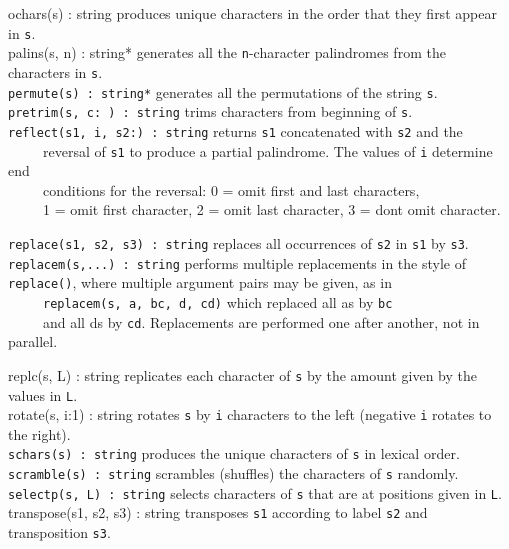 \textsf{ochars(s) : string} produces unique characters in the order that
they first appear in \texttt{s}.\\
\textsf{palins(s, n) : string*} generates all the \texttt{n}{}-character
palindromes from the characters in
\texttt{s}.\\
\texttt{permute(s) : string*} generates all the permutations of the
string \texttt{s}.\\
\texttt{pretrim(s, c:{\textquotesingle} {\textquotesingle}) : string}
trims characters from beginning of \texttt{s}.\\
\texttt{reflect(s1, i, s2:{\textquotedbl}{\textquotedbl}) : string}
returns \texttt{s1} concatenated with \texttt{s2} and the\\
 \ \ \ \ \ reversal of \texttt{s1} to produce a partial palindrome. The
values of \texttt{i} determine {\textquotedbl}end\\
 \ \ \ \ \ conditions{\textquotedbl} for the reversal: 0 = omit first
and last characters,\\
 \ \ \ \ \ 1 = omit first character, 2 = omit last character, 3 =
don{\textquotesingle}t omit character.

\texttt{replace(s1, s2, s3) : string} replaces all occurrences of
\texttt{s2} in \texttt{s1} by \texttt{s3}.\\
\texttt{replacem(s,...) : string} performs multiple replacements in the style of \texttt{replace()}, where multiple
argument pairs may be given, as in\\
 \ \ \ \ \ \texttt{replacem(s, {\textquotedbl}a{\textquotedbl},
{\textquotedbl}bc{\textquotedbl}, {\textquotedbl}d{\textquotedbl},
{\textquotedbl}cd{\textquotedbl})} which replaced all
a{\textquotesingle}s by
\texttt{{\textquotedbl}bc{\textquotedbl}\\
} \ \ \ \ \ and all d{\textquotesingle}s by
\texttt{{\textquotedbl}cd{\textquotedbl}}. Replacements are performed
one after another, not in parallel.

\textsf{replc(s, L) : string} replicates each character of \texttt{s} by
the amount given by the values in \texttt{L}.\\
\textsf{rotate(s, i:1) : string} rotates \texttt{s} by \texttt{i}
characters to the left (negative \texttt{i} rotates to the
right).\\
\texttt{schars(s) : string} produces the unique characters of \texttt{s}
in lexical order.\\
\texttt{scramble(s) : string} scrambles (shuffles) the characters of
\texttt{s} randomly.\\
\texttt{selectp(s, L) : string} selects characters of \texttt{s} that
are at positions given in \texttt{L}.\\
\textsf{transpose(s1, s2, s3) : string} transposes \texttt{s1} according
to label \texttt{s2} and transposition \texttt{s3}.

